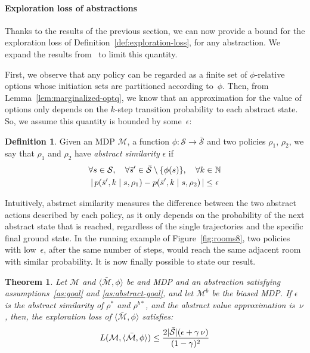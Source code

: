 \documentclass[letterpaper]{article} %
\theoremstyle{plain}
\newtheorem{theorem}{Theorem}
\theoremstyle{definition}
\newtheorem{definition}{Definition}
\theoremstyle{remark}
\DeclarePairedDelimiter{\abs}{\lvert}{\rvert}
\newcommand{\Naturals}{\mathbb{N}}
\newcommand{\Given}{\mid}
\newcommand{\SetSym}[1]{\mathcal{#1}}
\newcommand{\Policy}{\rho}
\newcommand{\States}{\SetSym{S}}
\newcommand{\Model}{\SetSym{M}}
\newcommand{\Mapping}{\phi}
\newcommand{\Biased}[1]{#1^{b}}
\newcommand{\BiasedStar}[1]{#1^{b*}}
\newcommand{\Abst}[1]{\bar{#1}}
\newcommand{\FromBlockTo}[3]{{#3}, {#2}}
\newcommand{\POptAccurate}{\epsilon}
\newcommand{\PHomogeneity}{\nu}
\begin{document}
\paragraph{Exploration loss of abstractions}

Thanks to the results of the previous section, we can now provide a bound for the exploration loss of Definition~\ref{def:exploration-loss}, for any abstraction.
We expand the results from~\cite{abel_2020_ValuePreserving} to limit this quantity.

First, we observe that any policy can be regarded as a finite set of $\Mapping$-relative options whose initiation sets are partitioned according to~$\Mapping$.
Then, from Lemma~\ref{lem:marginalized-optq}, we know that an approximation for the value of options only depends on the $k$-step transition probability to each abstract state.
So, we assume this quantity is bounded by some~$\POptAccurate$:
\begin{definition}
Given an MDP $\Model$, a function $\Mapping: \States \to \Abst\States$ and two policies $\Policy_1$, $\Policy_2$,
we say that $\Policy_1$ and $\Policy_2$ have \emph{abstract similarity} $\POptAccurate$ if
\begin{multline}
\forall s \in \States,\quad \forall \Abst{s}' \in \Abst{\States} \setminus \{\Mapping(s)\}, \quad
\forall k \in \Naturals \\
\abs{\,
p(\FromBlockTo{s}{k}{\Abst{s}'} \Given s, \Policy_1) -
p(\FromBlockTo{s}{k}{\Abst{s}'} \Given s, \Policy_2)\,
} \le \POptAccurate
\end{multline}
\label{def:similar-policies}
\end{definition}
Intuitively, abstract similarity measures the difference between the two abstract actions described by each policy,
as it only depends on the probability of the next abstract state that is reached, regardless of the single trajectories and the specific final ground state.
In the running example of Figure~\ref{fig:rooms8},
two policies with low~$\POptAccurate$, after the same number of steps, would reach the same adjacent room with similar probability.
It is now finally possible to state our result.
\begin{theorem}
Let $\Model$ and $\langle \Abst\Model, \Mapping \rangle$ be and MDP and an abstraction satisfying assumptions~\ref{as:goal} and \ref{as:abstract-goal},
and let $\Biased\Model$ be the biased MDP.
If $\epsilon$ is the abstract similarity of $\Policy^*$ and $\BiasedStar{\Policy}$, and the abstract value approximation is~$\PHomogeneity$, then, the exploration loss of $\langle \Abst\Model, \Mapping \rangle$ satisfies:
\begin{equation}
L(\Model, \langle \Abst\Model, \Mapping \rangle) \le
\frac{2 \abs{\Abst\States} (\POptAccurate + \gamma\, \PHomogeneity)}{(1-\gamma)^2}
\label{eq:exploration-loss-bound}
\end{equation}
\label{th:exploration-loss-bound}
\end{theorem}
\end{document}
